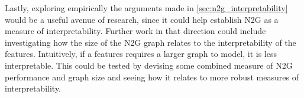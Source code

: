 Lastly, exploring empirically the arguments made in \autoref{sec:n2g_interpretability} would be a useful avenue of research, since it could help establish N2G as a measure of interpretability.
Further work in that direction could include investigating how the size of the N2G graph relates to the interpretability of the features.
Intuitively, if a features requires a larger graph to model, it is less interpretable.
This could be tested by devising some combined measure of N2G performance and graph size and seeing how it relates to more robust measures of interpretability.
